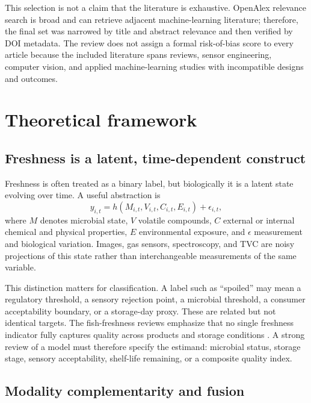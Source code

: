 \documentclass[11pt]{article}
\begin{document}
This selection is not a claim that the literature is exhaustive. OpenAlex relevance search is broad and can retrieve adjacent machine-learning literature; therefore, the final set was narrowed by title and abstract relevance and then verified by DOI metadata. The review does not assign a formal risk-of-bias score to every article because the included literature spans reviews, sensor engineering, computer vision, and applied machine-learning studies with incompatible designs and outcomes.

\section{Theoretical framework}

\subsection{Freshness is a latent, time-dependent construct}

Freshness is often treated as a binary label, but biologically it is a latent state evolving over time. A useful abstraction is
\begin{equation}
  y_{i,t} = h\left(M_{i,t}, V_{i,t}, C_{i,t}, E_{i,t}\right) + \epsilon_{i,t},
\end{equation}
where $M$ denotes microbial state, $V$ volatile compounds, $C$ external or internal chemical and physical properties, $E$ environmental exposure, and $\epsilon$ measurement and biological variation. Images, gas sensors, spectroscopy, and TVC are noisy projections of this state rather than interchangeable measurements of the same variable.

This distinction matters for classification. A label such as ``spoiled'' may mean a regulatory threshold, a sensory rejection point, a microbial threshold, a consumer acceptability boundary, or a storage-day proxy. These are related but not identical targets. The fish-freshness reviews emphasize that no single freshness indicator fully captures quality across products and storage conditions \citep{Franceschelli2021sensing,Zhang2022emerging,Madhubhashini2024current}. A strong review of a model must therefore specify the estimand: microbial status, storage stage, sensory acceptability, shelf-life remaining, or a composite quality index.

\subsection{Modality complementarity and fusion}
\end{document}
